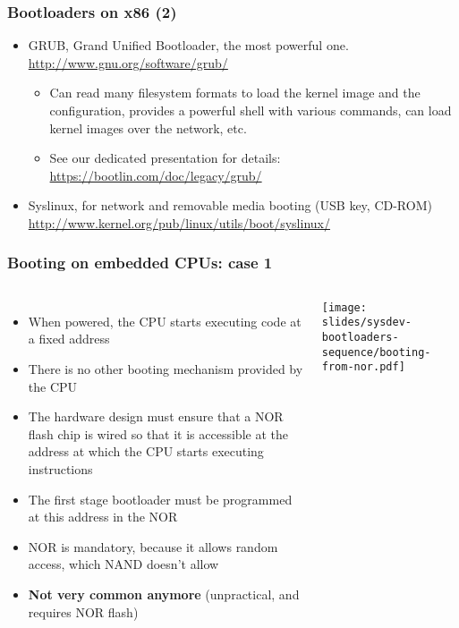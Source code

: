 \begin{frame}
  \frametitle{Bootloaders on x86 (2)}
  \begin{itemize}
  \item GRUB, Grand Unified Bootloader, the most powerful one.\\
    \url{http://www.gnu.org/software/grub/}
    \begin{itemize}
    \item Can read many filesystem formats to load the kernel image
      and the configuration, provides a powerful shell with various
      commands, can load kernel images over the network, etc.
    \item See our dedicated presentation for details:\\
      \url{https://bootlin.com/doc/legacy/grub/}
    \end{itemize}
  \item Syslinux, for network and removable media booting (USB key, CD-ROM)\\
    \small\url{http://www.kernel.org/pub/linux/utils/boot/syslinux/}\normalsize
  \end{itemize}
\end{frame}

\begin{frame}
  \frametitle{Booting on embedded CPUs: case 1}
  \begin{columns}
    \begin{itemize}
    \item When powered, the CPU starts executing code at a fixed address
    \item There is no other booting mechanism provided by the CPU
    \item The hardware design must ensure that a NOR flash chip is
      wired so that it is accessible at the address at which the CPU
      starts executing instructions
    \item The first stage bootloader must be programmed at this
      address in the NOR
    \item NOR is mandatory, because it allows random access, which
      NAND doesn't allow
    \item {\bf Not very common anymore} (unpractical, and requires NOR
      flash)
    \end{itemize}
    \texttt{[image: slides/sysdev-bootloaders-sequence/booting-from-nor.pdf]}
  \end{columns}
\end{frame}

